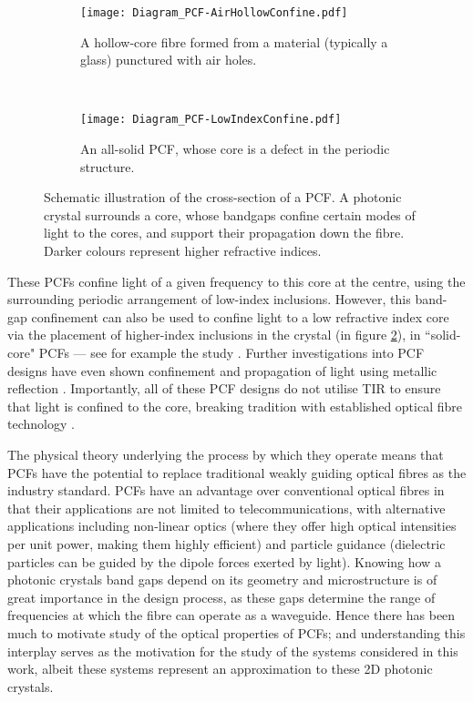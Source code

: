 \begin{figure}[b!]
	\centering
	\begin{subfigure}[t]{0.45\textwidth}
		\centering
		\texttt{[image: Diagram\_PCF-AirHollowConfine.pdf]}
		\caption{\label{fig:Diagram_PCF-AirHollowConfine.pdf} A hollow-core fibre formed from a material (typically a glass) punctured with air holes.}
	\end{subfigure}
	~
	\begin{subfigure}[t]{0.45\textwidth}
		\centering
		\texttt{[image: Diagram\_PCF-LowIndexConfine.pdf]}
		\caption{\label{fig:Diagram_PCF-LowIndexConfine.pdf} An all-solid PCF, whose core is a defect in the periodic structure.}
	\end{subfigure}
	\caption{\label{fig:Diagram_PCF} Schematic illustration of the cross-section of a PCF. A photonic crystal surrounds a core, whose bandgaps confine certain modes of light to the cores, and support their propagation down the fibre. Darker colours represent higher refractive indices.}
\end{figure}
These PCFs confine light of a given frequency to this core at the centre, using the surrounding periodic arrangement of low-index inclusions.
However, this band-gap confinement can also be used to confine light to a low refractive index core via the placement of higher-index inclusions in the crystal (in figure \ref{fig:Diagram_PCF-LowIndexConfine.pdf}), in ``solid-core" PCFs --- see for example the study \cite{luan2004allsolid}.
Further investigations into PCF designs have even shown confinement and propagation of light using metallic reflection \cite{hou2008metallic}.
Importantly, all of these PCF designs do not utilise TIR to ensure that light is confined to the core, breaking tradition with established optical fibre technology \cite{knight2003photonic, russell2003photonic}.

The physical theory underlying the process by which they operate means that PCFs have the potential to replace traditional weakly guiding optical fibres as the industry standard.
PCFs have an advantage over conventional optical fibres in that their applications are not limited to telecommunications, with alternative applications including non-linear optics (where they offer high optical intensities per unit power, making them highly efficient) and particle guidance (dielectric particles can be guided by the dipole forces exerted by light).
Knowing how a photonic crystals band gaps depend on its geometry and microstructure is of great importance in the design process, as these gaps determine the range of frequencies at which the fibre can operate as a waveguide.
Hence there has been much to motivate study of the optical properties of PCFs; and understanding this interplay serves as the motivation for the study of the systems considered in this work, albeit these systems represent an approximation to these 2D photonic crystals.


